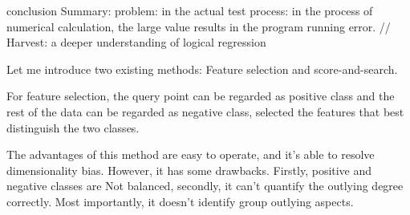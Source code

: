 \documentclass[
 size=14pt,
 paper=smartboard,  %
 mode=present, 		%
 display=slides, 	%
 style=tuliplab,  	%
 pauseslide,
 fleqn,leqno]{powerdot}
\begin{document}
\begin{slide}{conclusion}
  Summary: problem: in the actual test process: in the process of numerical calculation, the large value results in the program running error.  //     
  Harvest: a deeper understanding of logical regression

  
  
  
  \begin{note}
  Let me introduce two existing methods:
  Feature selection and score-and-search.
  
  For feature selection,
  the query point can be regarded as positive class and
  the rest of the data can be regarded as negative class,
  selected the features that best distinguish the two classes.
  
  The advantages of this method are easy to operate,
  and it's able to resolve dimensionality bias.
  However, it has some drawbacks.
  Firstly,
  positive and negative classes are Not balanced,
  secondly,
  it can't quantify the outlying degree correctly.
  Most importantly,
  it doesn't identify group outlying aspects.
  \end{note}
  
  \end{slide}
\end{document}
